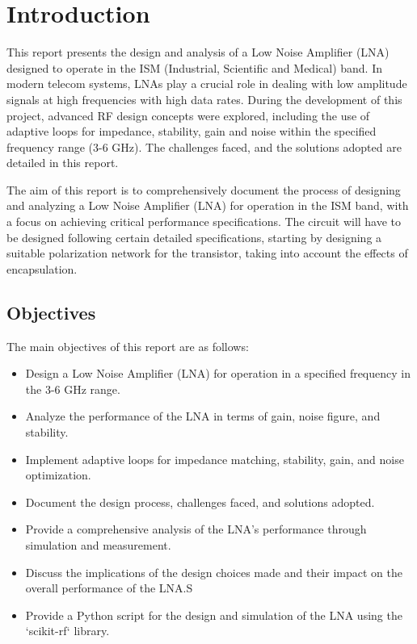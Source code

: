 \section{Introduction}

\label{sec:intro}
 This report presents the design and analysis of a Low Noise Amplifier (LNA) designed to operate in the ISM (Industrial, Scientific and Medical) band. In modern telecom systems, LNAs play a crucial role in dealing with low amplitude signals
 at high frequencies with high data rates. During the development of this project, advanced RF design concepts were explored, including the use of adaptive loops for impedance, stability, gain and noise within the specified frequency range (3-6 GHz). The challenges faced, and the solutions adopted are detailed in this report.

 The aim of this report is to comprehensively document the process of designing and analyzing
 a Low Noise Amplifier (LNA) for operation in the ISM band, with a focus on achieving critical performance specifications. The circuit will have to be designed following certain detailed specifications, starting by designing a suitable polarization network for the transistor, taking into account the effects of encapsulation.

 \subsection{Objectives}
 The main objectives of this report are as follows:
 \begin{itemize}
     \item Design a Low Noise Amplifier (LNA) for operation in a specified frequency in the 3-6 GHz range.
     \item Analyze the performance of the LNA in terms of gain, noise figure, and stability.
     \item Implement adaptive loops for impedance matching, stability, gain, and noise optimization.
     \item Document the design process, challenges faced, and solutions adopted.
     \item Provide a comprehensive analysis of the LNA's performance through simulation and measurement.
     \item Discuss the implications of the design choices made and their impact on the overall performance of the LNA.S
     \item Provide a Python script for the design and simulation of the LNA using the `scikit-rf` library.
 \end{itemize}
